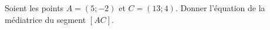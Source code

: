 
\begin{exercice}\label{exosmath-0082}

    Soient les points \( A=(5;-2)\) et \( C=(13;4)\). Donner l'équation de la médiatrice du segment \( [AC]\). 

\end{exercice}
